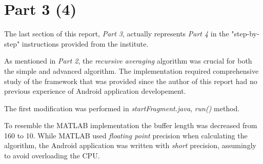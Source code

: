 \newpage
\section{Part 3 (4)}
The last section of this report, \emph{Part 3}, actually represents \emph{Part 4}
in the "step-by-step" instructions provided from the institute.

As mentioned in \emph{Part 2}, the \emph{recursive averaging} algorithm was
crucial for both the simple and advanced algorithm. The implementation required
comprehensive study of the framework that was provided since the author of this
report had no previous experience of Android application developement. 

The first modification was performed in \emph{startFragment.java},
\emph{run()} method. 



To resemble the MATLAB implementation the buffer length was decreased from 160
to 10.  While MATLAB used \emph{floating point} precision when calculating the 
algorithm, the Android application was written with \emph{short} precision, 
assumingly to avoid overloading the CPU.
